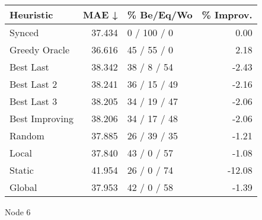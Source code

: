 \begin{tabular}{lrlr}
\toprule
\textbf{Heuristic} & \textbf{MAE ↓} & \textbf{\% Be/Eq/Wo} & \textbf{\% Improv.} \\
\midrule
            Synced &         37.434 &          0 / 100 / 0 &                0.00 \\
     Greedy Oracle &         36.616 &          45 / 55 / 0 &                2.18 \\
         Best Last &         38.342 &          38 / 8 / 54 &               -2.43 \\
       Best Last 2 &         38.241 &         36 / 15 / 49 &               -2.16 \\
       Best Last 3 &         38.205 &         34 / 19 / 47 &               -2.06 \\
    Best Improving &         38.206 &         34 / 17 / 48 &               -2.06 \\
            Random &         37.885 &         26 / 39 / 35 &               -1.21 \\
             Local &         37.840 &          43 / 0 / 57 &               -1.08 \\
            Static &         41.954 &          26 / 0 / 74 &              -12.08 \\
            Global &         37.953 &          42 / 0 / 58 &               -1.39 \\
\bottomrule
\end{tabular}
\caption{Node 6}
\label{tab:non_lr05_le2_bs2_6}
